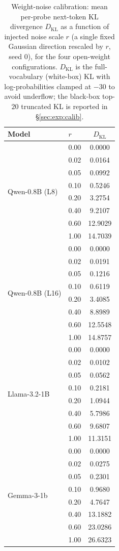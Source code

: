 \documentclass[11pt]{article}
\theoremstyle{definition}
\begin{document}
\begin{table}[t]
\centering
\small
\caption{Weight-noise calibration: mean per-probe next-token KL divergence
$D_{\mathrm{KL}}$ as a function of injected noise scale $r$ (a single fixed
Gaussian direction rescaled by $r$, seed $0$), for the four open-weight
configurations. $D_{\mathrm{KL}}$ is the full-vocabulary (white-box) KL with
log-probabilities clamped at $-30$ to avoid underflow; the black-box top-$20$
truncated KL is reported in \S\ref{sec:exp:calib}.}
\label{tab:calib}
\begin{tabular}{llc}
\toprule
Model & $r$ & $D_{\mathrm{KL}}$ \\
\midrule
\multirow{8}{*}{Qwen-0.8B (L8)} & 0.00 & 0.0000 \\
 & 0.02 & 0.0164 \\
 & 0.05 & 0.0992 \\
 & 0.10 & 0.5246 \\
 & 0.20 & 3.2754 \\
 & 0.40 & 9.2107 \\
 & 0.60 & 12.9029 \\
 & 1.00 & 14.7039 \\
\midrule
\multirow{8}{*}{Qwen-0.8B (L16)} & 0.00 & 0.0000 \\
 & 0.02 & 0.0191 \\
 & 0.05 & 0.1216 \\
 & 0.10 & 0.6119 \\
 & 0.20 & 3.4085 \\
 & 0.40 & 8.8989 \\
 & 0.60 & 12.5548 \\
 & 1.00 & 14.8757 \\
\midrule
\multirow{8}{*}{Llama-3.2-1B} & 0.00 & 0.0000 \\
 & 0.02 & 0.0102 \\
 & 0.05 & 0.0562 \\
 & 0.10 & 0.2181 \\
 & 0.20 & 1.0944 \\
 & 0.40 & 5.7986 \\
 & 0.60 & 9.6807 \\
 & 1.00 & 11.3151 \\
\midrule
\multirow{8}{*}{Gemma-3-1b} & 0.00 & 0.0000 \\
 & 0.02 & 0.0275 \\
 & 0.05 & 0.2301 \\
 & 0.10 & 0.9680 \\
 & 0.20 & 4.7647 \\
 & 0.40 & 13.1882 \\
 & 0.60 & 23.0286 \\
 & 1.00 & 26.6323 \\
\bottomrule
\end{tabular}
\end{table}
\end{document}
